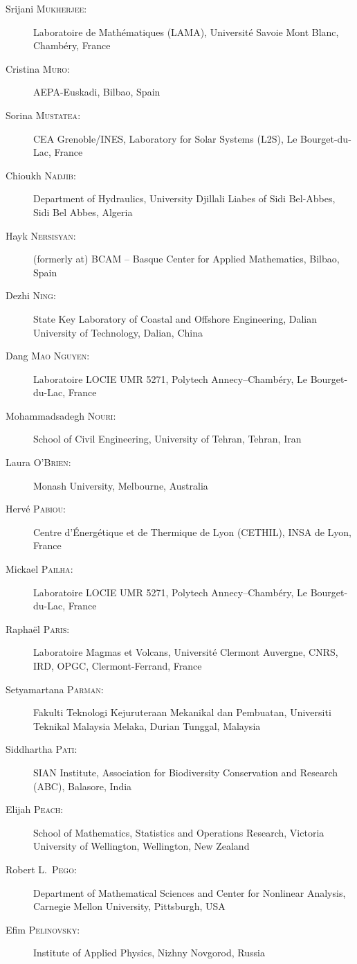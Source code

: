\begin{description}
  \item[Srijani \textsc{Mukherjee}:] Laboratoire de Math\'ematiques (LAMA), Universit\'e Savoie Mont Blanc, Chamb\'ery, France
  \item[Cristina \textsc{Muro}:] AEPA-Euskadi, Bilbao, Spain
  \item[Sorina \textsc{Mustatea}:] CEA Grenoble/INES, Laboratory for Solar Systems (L2S), Le Bourget-du-Lac, France
  \item[Chioukh \textsc{Nadjib}:] Department of Hydraulics, University Djillali Liabes of Sidi Bel-Abbes, Sidi Bel Abbes, Algeria
  \item[Hayk \textsc{Nersisyan}:] (formerly at) BCAM -- Basque Center for Applied Mathematics, Bilbao, Spain
  \item[Dezhi \textsc{Ning}:] State Key Laboratory of Coastal and Offshore Engineering, Dalian University of Technology, Dalian, China
  \item[Dang \textsc{Mao Nguyen}:] Laboratoire LOCIE UMR 5271, Polytech Annecy--Chamb\'ery, Le Bourget-du-Lac, France
  \item[Mohammadsadegh \textsc{Nouri}:] School of Civil Engineering, University of Tehran, Tehran, Iran
  \item[Laura \textsc{O'Brien}:] Monash University, Melbourne, Australia
  \item[Herv\'e \textsc{Pabiou}:] Centre d'\'Energ\'etique et de Thermique de Lyon (CETHIL), INSA de Lyon, France
  \item[Mickael \textsc{Pailha}:] Laboratoire LOCIE UMR 5271, Polytech Annecy--Chamb\'ery, Le Bourget-du-Lac, France
  \item[Rapha\"el \textsc{Paris}:] Laboratoire Magmas et Volcans, Universit\'e Clermont Auvergne, CNRS, IRD, OPGC, Clermont-Ferrand, France
  \item[Setyamartana \textsc{Parman}:] Fakulti Teknologi Kejuruteraan Mekanikal dan Pembuatan, Universiti Teknikal Malaysia Melaka, Durian Tunggal, Malaysia
  \item[Siddhartha \textsc{Pati}:] SIAN Institute, Association for Biodiversity Conservation and Research (ABC), Balasore, India
  \item[Elijah \textsc{Peach}:] School of Mathematics, Statistics and Operations Research, Victoria University of Wellington, Wellington, New Zealand
  \item[Robert L.~\textsc{Pego}:] Department of Mathematical Sciences and Center for Nonlinear Analysis, Carnegie Mellon University, Pittsburgh, USA
  \item[Efim \textsc{Pelinovsky}:] Institute of Applied Physics, Nizhny Novgorod, Russia

\end{description}
